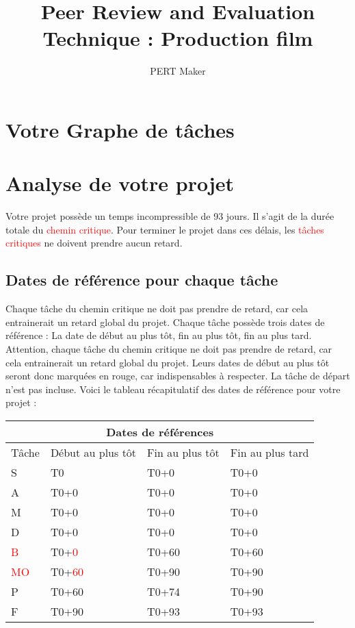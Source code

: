 \documentclass{article}
\title{\centering Peer Review and Evaluation Technique : Production film
}
\author{PERT Maker}
\begin{document}
\maketitle
\tableofcontents{}
\section{Votre Graphe de tâches}
\begin{center}
\end{center}
\section{Analyse de votre projet}
Votre projet possède un temps incompressible de 93 jours.
    Il s'agit de la durée totale du \textcolor{red}{chemin critique}.
    Pour terminer le projet dans ces délais, les \textcolor{red}{tâches critiques} ne doivent prendre aucun retard.\subsection{Dates de référence pour chaque tâche}Chaque tâche du chemin critique ne doit pas prendre de
    retard, car cela entrainerait un retard global du projet. 
    Chaque tâche possède trois dates de référence : La date de début au plus tôt,
    fin au plus tôt, fin au plus tard.
    Attention, chaque tâche du chemin critique ne doit pas prendre de
    retard, car cela entrainerait un retard global du projet.
    Leurs dates de début au plus tôt seront donc marquées en rouge,
    car indispensables à respecter. La tâche de départ n'est pas incluse. \newpage
    Voici le tableau récapitulatif des dates de référence pour votre projet :\newline 
\begin{tabular}{ |p{3cm}||p{3cm}|p{3cm}|p{3cm}|  }
        \hline
        \multicolumn{4}{|c|}{Dates de références} \\
        \hline 
        Tâche&Début au plus tôt&Fin au plus tôt&Fin au plus tard \\ 
        \hline 
S&T0&T0+0&T0+0 \\ 
A&T0+0&T0+0&T0+0 \\ 
M&T0+0&T0+0&T0+0 \\ 
D&T0+0&T0+0&T0+0 \\ 
\textcolor{red}{B}&T0+\textcolor{red}{0}&T0+60&T0+60 \\ 
\textcolor{red}{MO}&T0+\textcolor{red}{60}&T0+90&T0+90 \\ 
P&T0+60&T0+74&T0+90 \\ 
F&T0+90&T0+93&T0+93 \\ 
\hline
    \end{tabular} 
\end{document}
